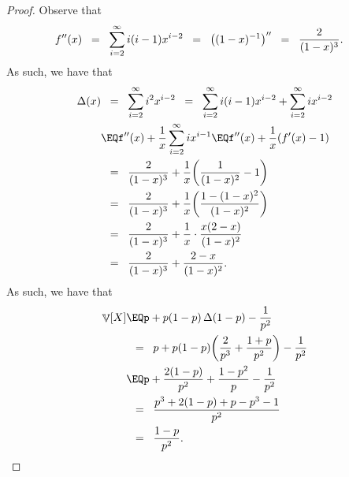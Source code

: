 \begin{proof}
    Observe that
    \begin{align*}
        f''(x)
        &\EQ%
        \sum_{i=2}^\infty i (i-1) x^{i-2}%
        \EQ%
        \pth{ (1-x)^{-1}}''%
        \EQ
        \frac{2}{(1-x)^3}.
    \end{align*}
    As such, we have that
    \begin{align*}
        \Delta(x)%
        &\EQ
        \sum_{i=2}^\infty i^2 x^{i-2}%
        \EQ%
        \sum_{i=2}^\infty i(i-1) x^{i-2} + \sum_{i=2}^\infty i
        x^{i-2}%
        \\&
        \EQ%
        f''(x) +\frac{1}{x} \sum_{i=2}^\infty i x^{i-1}%
        \EQ%
        f''(x) +\frac{1}{x} \pth{f'(x) - 1}%
        \\&
        \EQ%
        \frac{2}{(1-x)^3} + \frac{1}{x} \pth[]{ \frac{1}{(1-x)^2} -1
        }%
        \\&
        \EQ%
        \frac{2}{(1-x)^3} + \frac{1}{x} \pth[]{ \frac{1 -
              (1-x)^2}{(1-x)^2} }%
        \\&%
        \EQ%
        \frac{2}{(1-x)^3} + \frac{1}{x} \cdot{ \frac{x (2-x)}
           {(1-x)^2} }%
        \\&%
        \EQ%
        \frac{2}{(1-x)^3} + \frac{2-x} {(1-x)^2}. %
    \end{align*}
    As such, we have that
    \begin{align*}
      \Var{ X}%
      &\EQ%
        p + p(1-p)\, \Delta(1-p) - \frac{1}{p^2}%
        \\&
        \EQ %
        p + p(1-p) \pth{\frac{2}{p^3} + \frac{1+p}{p^2}} -
        \frac{1}{p^2}%
        \\&
        \EQ%
        p + \frac{2(1-p)}{p^2} + \frac{1-p^2}{p} - \frac{1}{p^2}%
        \\&%
        \EQ%
        \frac{p^3 + 2(1-p) + p-p^3 -1 }{p^2}%
        \\&
        \EQ%
        \frac{ 1-p }{p^2}.
    \end{align*}
\end{proof}












